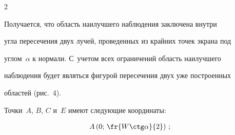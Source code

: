 \begin{multicols}{2}




































     


     Получается, что область наилучшего наблюдения заключена внутри 


угла пересечения двух лучей, проведенных из крайних точек экрана под 


углом~$\alpha$ к нормали. С~учетом всех ограничений область наилучшего 


наблюдения будет являться фигурой пересечения двух уже построенных 


областей (рис.~4).











    Точки~$A$, $B$, $C$ и~$E$ имеют следующие коорди\-наты:


    \begin{align*}


&A\left( 0;\,\fr{W\ctg\alpha}{2}\right)\,;


\end{align*}






\end{multicols}
